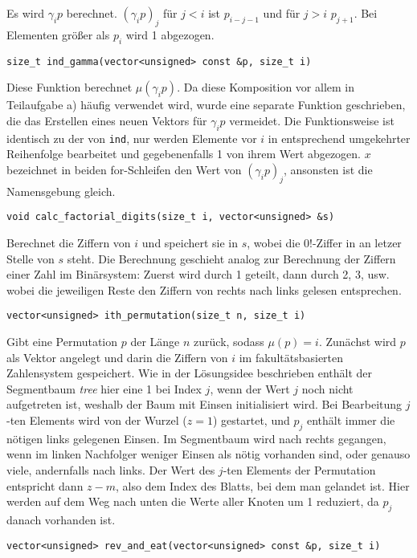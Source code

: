 \documentclass[a4paper, 11pt, ngerman]{article}
\begin{document}
\noindent Es wird $\gamma_i p$ berechnet. $(\gamma_i p)_j$ für $j < i$ ist $p_{i - j - 1}$ und für $j > i$ $p_{j + 1}$. Bei Elementen größer als $p_i$ wird 1 abgezogen.
\bigskip

\noindent \verb|size_t ind_gamma(vector<unsigned> const &p, size_t i)|
\smallskip

\noindent Diese Funktion berechnet $\mu(\gamma_i p)$. Da diese Komposition vor allem in Teilaufgabe a) häufig verwendet wird, wurde eine separate Funktion geschrieben, die das Erstellen eines neuen Vektors für $\gamma_i p$ vermeidet. Die Funktionsweise ist identisch zu der von \verb|ind|, nur werden Elemente vor $i$ in entsprechend umgekehrter Reihenfolge bearbeitet und gegebenenfalls 1 von ihrem Wert abgezogen. $x$ bezeichnet in beiden for-Schleifen den Wert von $(\gamma_i p)_j$, ansonsten ist die Namensgebung gleich.
\bigskip

\noindent \verb|void calc_factorial_digits(size_t i, vector<unsigned> &s)|
\smallskip

\noindent Berechnet die Ziffern von $i$ und speichert sie in $s$, wobei die $0!$-Ziffer in an letzer Stelle von $s$ steht. Die Berechnung geschieht analog zur Berechnung der Ziffern einer Zahl im Binärsystem: Zuerst wird durch 1 geteilt, dann durch 2, 3, usw. wobei die jeweiligen Reste den Ziffern von rechts nach links gelesen entsprechen.
\bigskip

\noindent \verb|vector<unsigned> ith_permutation(size_t n, size_t i)|
\smallskip

\noindent Gibt eine Permutation $p$ der Länge $n$ zurück, sodass $\mu(p) = i$. Zunächst wird $p$ als Vektor angelegt und darin die Ziffern von $i$ im fakultätsbasierten Zahlensystem gespeichert. Wie in der Lösungsidee beschrieben enthält der Segmentbaum \emph{tree} hier eine 1 bei Index $j$, wenn der Wert $j$ noch nicht aufgetreten ist, weshalb der Baum mit Einsen initialisiert wird. Bei Bearbeitung $j$-ten Elements wird von der Wurzel ($z = 1$) gestartet, und $p_j$ enthält immer die nötigen links gelegenen Einsen. Im Segmentbaum wird nach rechts gegangen, wenn im linken Nachfolger weniger Einsen als nötig vorhanden sind, oder genauso viele, andernfalls nach links. Der Wert des $j$-ten Elements der Permutation entspricht dann $z - m$, also dem Index des Blatts, bei dem man gelandet ist. Hier werden auf dem Weg nach unten die Werte aller Knoten um 1 reduziert, da $p_j$ danach vorhanden ist.
\bigskip

\noindent \verb|vector<unsigned> rev_and_eat(vector<unsigned> const &p, size_t i)|
\smallskip
\end{document}
